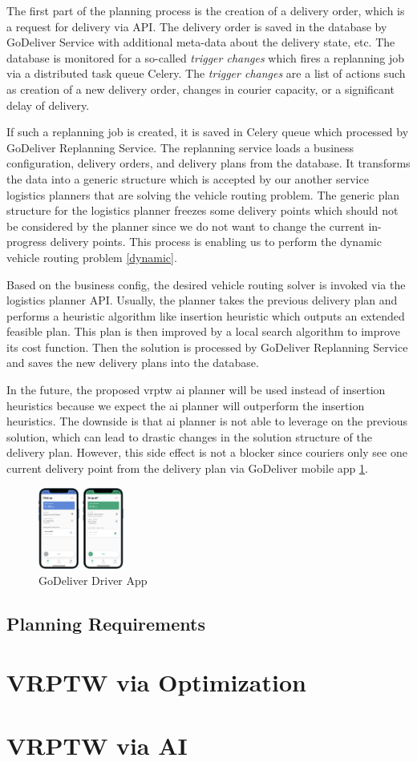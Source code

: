 The first part of the planning process is the creation of a delivery order, which is a request for delivery via API. The delivery order is saved in the database by GoDeliver Service with additional meta-data about the delivery state, etc. The database is monitored for a so-called \textit{trigger changes} which fires a replanning job via a distributed task queue Celery. The \textit{trigger changes} are a list of actions such as creation of a new delivery order, changes in courier capacity, or a significant delay of delivery.

If such a replanning job is created, it is saved in Celery queue which processed by GoDeliver Replanning Service. The replanning service loads a business configuration, delivery orders, and delivery plans from the database. It transforms the data into a generic structure which is accepted by our another service logistics planners that are solving the vehicle routing problem. The generic plan structure for the logistics planner freezes some delivery points which should not be considered by the planner since we do not want to change the current in-progress delivery points. This process is enabling us to perform the dynamic vehicle routing problem \ref{dynamic}.

Based on the business config, the desired vehicle routing solver is invoked via the logistics planner API. Usually, the planner takes the previous delivery plan and performs a heuristic algorithm like insertion heuristic which outputs an extended feasible plan. This plan is then improved by a local search algorithm to improve its cost function. Then the solution is processed by GoDeliver Replanning Service and saves the new delivery plans into the database.

In the future, the proposed \gls{vrptw} \gls{ai} planner will be used instead of insertion heuristics because we expect the \gls{ai} planner will outperform the insertion heuristics. The downside is that \gls{ai} planner is not able to leverage on the previous solution, which can lead to drastic changes in the solution structure of the delivery plan. However, this side effect is not a blocker since couriers only see one current delivery point from the delivery plan via GoDeliver mobile app \ref{fig:godeliver-app}.

\begin{figure}[ht]
    \centering
    \includegraphics[width=0.25\textwidth]{resources/implementation/godeliver-app.png}
    \caption{GoDeliver Driver App}
    \label{fig:godeliver-app}
\end{figure}

\subsection{Planning Requirements}


\section{VRPTW via Optimization}

\section{VRPTW via AI}